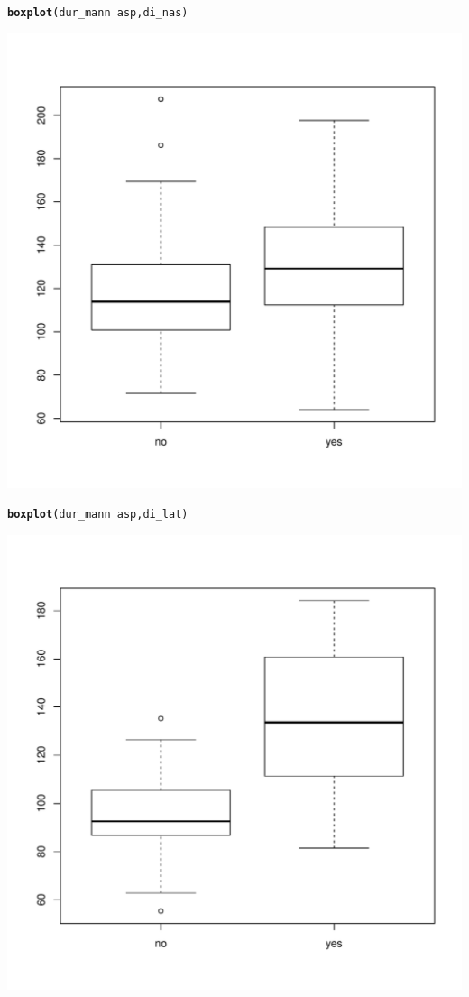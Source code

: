 \documentclass[a4paper,11pt]{article}\usepackage[]{graphicx}\usepackage[]{color}
\makeatletter
\def\maxwidth{ %
  \ifdim\Gin@nat@width>\linewidth
    \linewidth
  \else
    \Gin@nat@width
  \fi
}
\newcommand{\hlopt}[1]{\textcolor[rgb]{0,0,0}{#1}}%
\newcommand{\hlstd}[1]{\textcolor[rgb]{0.345,0.345,0.345}{#1}}%
\newcommand{\hlkwd}[1]{\textcolor[rgb]{0.737,0.353,0.396}{\textbf{#1}}}%
\newenvironment{kframe}{%
 \def\at@end@of@kframe{}%
 \ifinner\ifhmode%
  \def\at@end@of@kframe{\end{minipage}}%
  \begin{minipage}{\columnwidth}%
 \fi\fi%
 \def\FrameCommand##1{\hskip\@totalleftmargin \hskip-\fboxsep
 \colorbox{shadecolor}{##1}\hskip-\fboxsep
     \hskip-\linewidth \hskip-\@totalleftmargin \hskip\columnwidth}%
 \MakeFramed {\advance\hsize-\width
   \@totalleftmargin\z@ \linewidth\hsize
   \@setminipage}}%
 {\par\unskip\endMakeFramed%
 \at@end@of@kframe}
\newenvironment{knitrout}{}{} %
\makeatother
\begin{document}
\begin{knitrout}
\begin{kframe}\begin{alltt}
\hlkwd{boxplot}\hlstd{(dur_mann} \hlopt{~} \hlstd{asp, di_nas)}
\end{alltt}
\end{kframe}
\includegraphics[width=\maxwidth]{img/unnamed-chunk-24-3} 
\begin{kframe}\begin{alltt}
\hlkwd{boxplot}\hlstd{(dur_mann} \hlopt{~} \hlstd{asp, di_lat)}
\end{alltt}
\end{kframe}
\includegraphics[width=\maxwidth]{img/unnamed-chunk-24-4} 

\end{knitrout}
\end{document}
